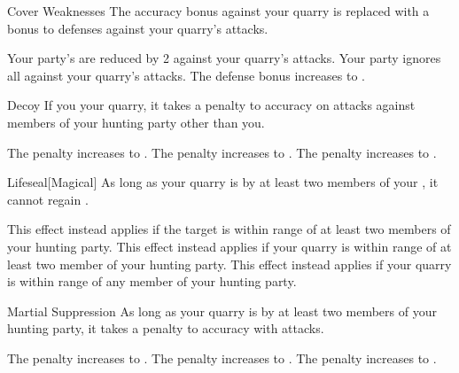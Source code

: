 {            \begin{freeability}{Cover Weaknesses}
                The accuracy bonus against your quarry is replaced with a  bonus to defenses against your quarry's attacks.

                \rankline
                 Your party's  are reduced by 2 against your quarry's attacks.
                 Your party ignores all  against your quarry's attacks.
                 The defense bonus increases to .
            \end{freeability}

            \begin{freeability}{Decoy}
                If you  your quarry, it takes a  penalty to accuracy on attacks against members of your hunting party other than you.

                \rankline
                 The penalty increases to .
                 The penalty increases to .
                 The penalty increases to .
            \end{freeability}

            \begin{freeability}{Lifeseal}[Magical]
                As long as your quarry is  by at least two members of your , it cannot regain .

                \rankline
                 This effect instead applies if the target is within \rngmed range of at least two members of your hunting party.
                 This effect instead applies if your quarry is within \rnglong range of at least two member of your hunting party.
                 This effect instead applies if your quarry is within \rnglong range of any member of your hunting party.
            \end{freeability}

            \begin{freeability}{Martial Suppression}
                As long as your quarry is  by at least two members of your hunting party, it takes a  penalty to accuracy with  attacks.

                \rankline
                 The penalty increases to .
                 The penalty increases to .
                 The penalty increases to .
            \end{freeability}

}

